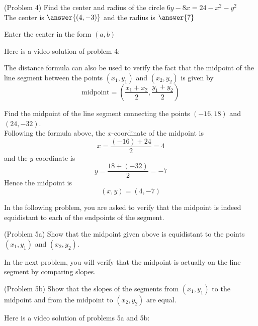 \documentclass[handout]{ximera}
\begin{document}
\begin{problem}(Problem 4)
Find the center and radius of the circle $6y - 8x= 24 -x^2 - y^2$\\
The center is $\answer{(4, -3)}$ and the radius is $\answer{7}$\\
\begin{hint}
Enter the center in the form $(a,b)$
\end{hint}
\end{problem}

Here is a video solution of problem 4:\\
\begin{foldable}
\end{foldable}

The distance formula can also be used to verify the fact that the midpoint of the line segment between the points 
$(x_1,y_1)$ and $(x_2, y_2)$ is given by
\[
\text{midpoint} = \left(\frac{x_1+x_2}{2}, \frac{y_1+y_2}{2}\right)
\]

\begin{example}[Example 5]
Find the midpoint of the line segment connecting the points $(-16,18)$ and $(24,-32)$.\\
Following the formula above, the $x$-coordinate of the midpoint is
\[
x = \frac{ (-16)+24 }{2} = 4
\]
and the $y$-coordinate is
\[
y = \frac{ 18+ (-32)}{2} = -7
\]
Hence the midpoint is
\[
(x,y) = (4,-7)
\]
\end{example}

In the following problem, you are asked to verify that the midpoint is indeed equidistant to each of the endpoints of the segment.

\begin{problem}(Problem 5a)
Show that the midpoint given above is equidistant to the points $(x_1, y_1)$ and $(x_2, y_2)$.
\end{problem}
In the next problem, you will verify that the midpoint is actually on the line segment by comparing slopes.
\begin{problem}(Problem 5b)
Show that the slopes of the segments from $(x_1, y_1)$ to the midpoint and from the midpoint to $(x_2, y_2)$ are equal.
\end{problem}

Here is a video solution of problems 5a and 5b:\\
\begin{foldable}
\end{foldable}
\end{document}
